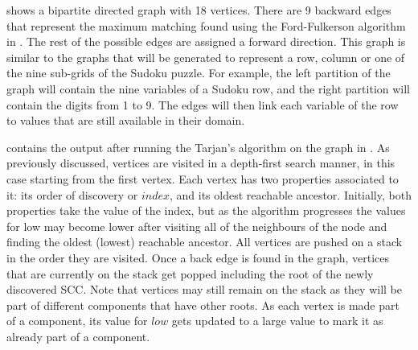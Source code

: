 \documentclass{l4proj}
\begin{document}
\noindent {} shows a bipartite directed graph with 18 vertices. There are 9 backward edges that represent the maximum matching found using the Ford-Fulkerson algorithm \cite{ford1956maximal} in . The rest of the possible edges are assigned a forward direction. This graph is similar to the graphs that will be generated to represent a row, column or one of the nine sub-grids of the Sudoku puzzle. For example, the left partition of the graph will contain the nine variables of a Sudoku row, and the right partition will contain the digits from 1 to 9. The edges will then link each variable of the row to values that are still available in their domain.

\noindent {} contains the output after running the Tarjan's algorithm \cite{tarjan1972depth} on the graph in . As previously discussed, vertices are visited in a depth-first search manner, in this case starting from the first vertex. Each vertex has two properties associated to it: its order of discovery or $index$, and its oldest reachable ancestor. Initially, both properties take the value of the index, but as the algorithm progresses the values for low may become lower after visiting all of the neighbours of the node and finding the oldest (lowest) reachable ancestor. All vertices are pushed on a stack in the order they are visited. Once a back edge is found in the graph, vertices that are currently on the stack get popped including the root of the newly discovered SCC. Note that vertices may still remain on the stack as they will be part of different components that have other roots. As each vertex is made part of a component, its value for $low$ gets updated to a large value to mark it as already part of a component.

\newpage
\end{document}
